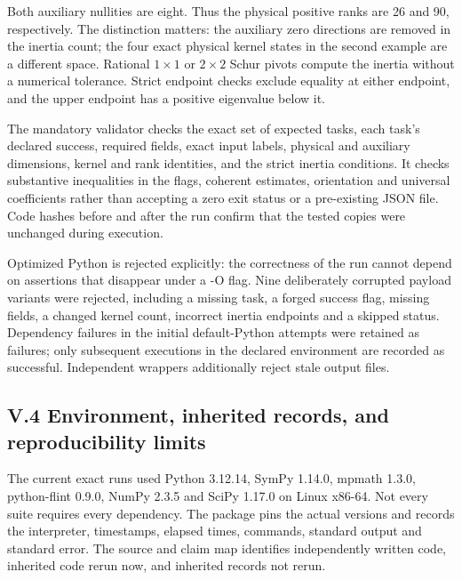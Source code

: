 \documentclass[a4paper,11pt]{article}
\numberwithin{equation}{section}
\begin{document}
Both auxiliary nullities are eight. Thus the physical positive ranks are 26 and 90, respectively. The distinction matters: the auxiliary zero directions are removed in the inertia count; the four exact physical kernel states in the second example are a different space. Rational \(1\times1\) or \(2\times2\) Schur pivots compute the inertia without a numerical tolerance. Strict endpoint checks exclude equality at either endpoint, and the upper endpoint has a positive eigenvalue below it.

The mandatory validator checks the exact set of expected tasks, each task's declared success, required fields, exact input labels, physical and auxiliary dimensions, kernel and rank identities, and the strict inertia conditions. It checks substantive inequalities in the flags, coherent estimates, orientation and universal coefficients rather than accepting a zero exit status or a pre-existing JSON file. Code hashes before and after the run confirm that the tested copies were unchanged during execution.

Optimized Python is rejected explicitly: the correctness of the run cannot depend on assertions that disappear under a -O flag. Nine deliberately corrupted payload variants were rejected, including a missing task, a forged success flag, missing fields, a changed kernel count, incorrect inertia endpoints and a skipped status. Dependency failures in the initial default-Python attempts were retained as failures; only subsequent executions in the declared environment are recorded as successful. Independent wrappers additionally reject stale output files.

\hypertarget{v.4-environment-inherited-records-and-reproducibility-limits}{%
\subsection{V.4 Environment, inherited records, and reproducibility limits}\label{v.4-environment-inherited-records-and-reproducibility-limits}}

The current exact runs used Python 3.12.14, SymPy 1.14.0, mpmath 1.3.0, python-flint 0.9.0, NumPy 2.3.5 and SciPy 1.17.0 on Linux x86-64. Not every suite requires every dependency. The package pins the actual versions and records the interpreter, timestamps, elapsed times, commands, standard output and standard error. The source and claim map identifies independently written code, inherited code rerun now, and inherited records not rerun.
\end{document}

